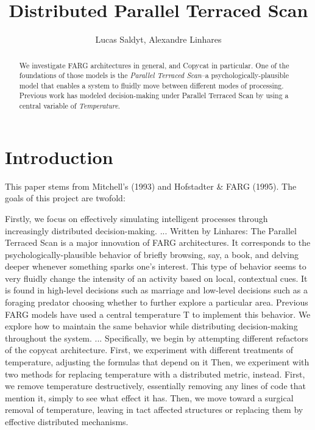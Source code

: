 \documentclass[a4paper]{article}
\title{Distributed Parallel Terraced Scan}
\author{Lucas Saldyt, Alexandre Linhares}
\begin{document}
\maketitle

\begin{abstract}
We investigate FARG architectures in general, and Copycat in particular.  One of the foundations of those models is the \emph{Parallel Terraced Scan}--a psychologically-plausible model that enables a system to fluidly move between different modes of processing.  Previous work has modeled decision-making under Parallel Terraced Scan by using a central variable of \emph{Temperature}. 

\end{abstract}

\section{Introduction}

    This paper stems from Mitchell's (1993) and Hofstadter \& FARG (1995). The goals of this project are twofold:

    Firstly, we focus on effectively simulating intelligent processes through increasingly distributed decision-making.
    ...
    Written by Linhares:
    The Parallel Terraced Scan is a major innovation of FARG architectures. 
    It corresponds to the psychologically-plausible behavior of briefly browsing, say, a book, and delving deeper whenever something sparks one's interest. 
    This type of behavior seems to very fluidly change the intensity of an activity based on local, contextual cues. 
    It is found in high-level decisions such as marriage and low-level decisions such as a foraging predator choosing whether to further explore a particular area. 
    Previous FARG models have used a central temperature T to implement this behavior. 
    We explore how to maintain the same behavior while distributing decision-making throughout the system.
    ...
    Specifically, we begin by attempting different refactors of the copycat architecture.
    First, we experiment with different treatments of temperature, adjusting the formulas that depend on it
    Then, we experiment with two methods for replacing temperature with a distributed metric, instead.
    First, we remove temperature destructively, essentially removing any lines of code that mention it, simply to see what effect it has.
    Then, we move toward a surgical removal of temperature, leaving in tact affected structures or replacing them by effective distributed mechanisms.
\end{document}
